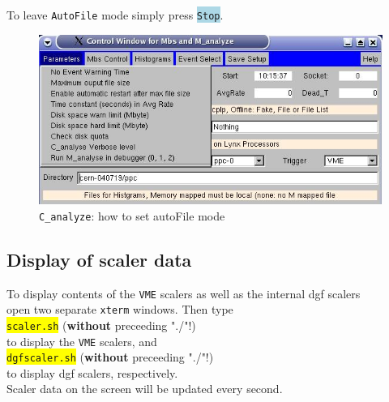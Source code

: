 \documentclass[10pt]{article}
\newcommand{\blue}[1]{\colorbox{lightblue}{\texttt{#1}}}
\newcommand{\yellow}[1]{\colorbox{yellow}{\texttt{#1}}}
\begin{document}
To leave \texttt{AutoFile} mode simply press \blue{Stop}.

\begin{figure}[H]
\centerline{\includegraphics[width=\linewidth]{C_analyzeSetFileSize}}
\caption{\texttt{C\_analyze}: how to set autoFile mode}
\label{CanalyzeSetFileSize}
\end{figure}
\newpage
\subsection{Display of scaler data}\label{ScalerData}\vspace{3mm}

To display contents of the \texttt{VME} scalers as well as the internal dgf scalers\\
open two separate \texttt{xterm} windows. Then type\\

\hspace*{.2\linewidth}\yellow{scaler.sh} (\textbf{without} preceeding "./"!)\\

to display the \texttt{VME} scalers, and\\

\hspace*{.2\linewidth}\yellow{dgfscaler.sh} (\textbf{without} preceeding "./"!)\\

to display dgf scalers, respectively.\\
Scaler data on the screen will be updated every second.
\end{document}
